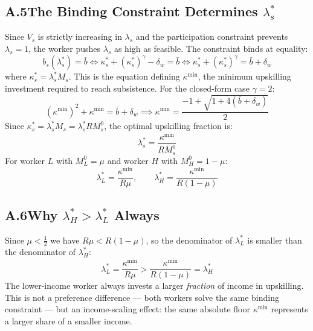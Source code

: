 \documentclass[12pt,a4paper]{article}
\begin{document}
\subsection*{A.5\quad The Binding Constraint Determines $\lambda_s^*$}

Since $V_s$ is strictly increasing in $\lambda_s$ and the participation
constraint prevents $\lambda_s = 1$, the worker pushes $\lambda_s$
as high as feasible. The constraint binds at equality:
\begin{equation}
  b_s(\lambda_s^*) = \bar{b}
  \iff
  \kappa_s^* + (\kappa_s^*)^\gamma - \delta_w = \bar{b}
  \iff
  \kappa_s^* + (\kappa_s^*)^\gamma = \bar{b} + \delta_w
  \tag{A.15}
  \label{eq:binding_pc}
\end{equation}
where $\kappa_s^* = \lambda_s^* M_s$. This is the equation defining
$\kappa^{\min}$, the minimum upskilling investment required to reach
subsistence. For the closed-form case $\gamma = 2$:
\begin{equation}
  (\kappa^{\min})^2 + \kappa^{\min} = \bar{b} + \delta_w
  \implies
  \kappa^{\min} = \frac{-1 + \sqrt{1 + 4(\bar{b} + \delta_w)}}{2}
  \tag{A.16}
  \label{eq:kmin_solve}
\end{equation}
Since $\kappa_s^* = \lambda_s^* M_s = \lambda_s^* R M_s^0$, the
optimal upskilling fraction is:
\begin{equation}
  \lambda_s^* = \frac{\kappa^{\min}}{R M_s^0}
  \tag{A.17}
  \label{eq:lambda_star_app}
\end{equation}
For worker $L$ with $M_L^0 = \mu$ and worker $H$ with $M_H^0 = 1-\mu$:
\begin{equation}
  \boxed{
  \lambda_L^* = \frac{\kappa^{\min}}{R\mu},
  \qquad
  \lambda_H^* = \frac{\kappa^{\min}}{R(1-\mu)}
  }
  \tag{A.18}
  \label{eq:lambda_star_final}
\end{equation}

\subsection*{A.6\quad Why $\lambda_H^* > \lambda_L^*$ Always}

Since $\mu < \tfrac{1}{2}$ we have $R\mu < R(1-\mu)$, so the denominator
of $\lambda_L^*$ is smaller than the denominator of $\lambda_H^*$:
\begin{equation}
  \lambda_L^* = \frac{\kappa^{\min}}{R\mu}
  > \frac{\kappa^{\min}}{R(1-\mu)} = \lambda_H^*
  \tag{A.19}
  \label{eq:lambda_ordering_app}
\end{equation}
The lower-income worker always invests a larger \emph{fraction} of
income in upskilling. This is not a preference difference --- both
workers solve the same binding constraint --- but an income-scaling
effect: the same absolute floor $\kappa^{\min}$ represents a larger
share of a smaller income.
\end{document}
